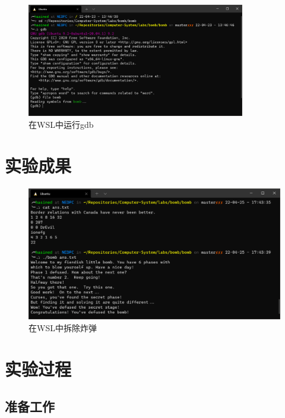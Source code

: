 \begin{figure}[H]
    \centering
    \includegraphics[width=0.85\textwidth]{env.png}
    \caption{在WSL中运行gdb}\label{fig:env}
\end{figure}

\section{实验成果}

\begin{figure}[H]
    \centering
    \includegraphics[width=\textwidth]{ans.png}
    \caption{在WSL中拆除炸弹}
\end{figure}

\section{实验过程}\label{procedure}

\subsection{准备工作}\label{prepare}

